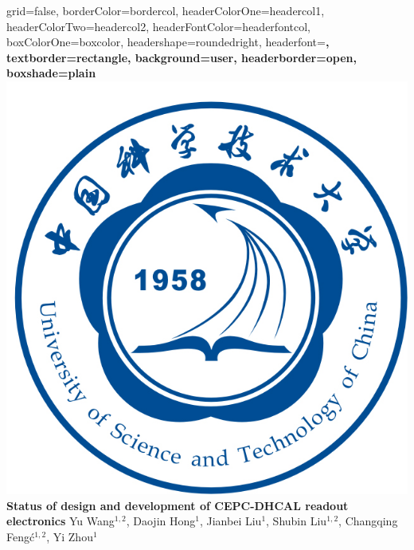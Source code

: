\documentclass[a0paper,portrait]{baposter}
\begin{document}
\begin{poster}{
grid=false,
borderColor=bordercol, %
headerColorOne=headercol1, %
headerColorTwo=headercol2, %
headerFontColor=headerfontcol, %
boxColorOne=boxcolor, %
headershape=roundedright, %
headerfont=\Large\sf\bf, %
textborder=rectangle,
background=user,
headerborder=open, %
boxshade=plain
}
{\includegraphics[scale=0.2]{ustcblue.jpg}}
%
%
{ \bf  \huge {Status of design and development of CEPC-DHCAL readout electronics} } %
{\vspace{0.3em} \smaller Yu Wang$^{1,2}$, Daojin Hong$^1$, Jianbei Liu$^1$, Shubin Liu$^{1,2}$, Changqing Feng\'c$^{1,2}$, Yi Zhou$^1$   \\  %
  
}
\end{poster}
\end{document}
